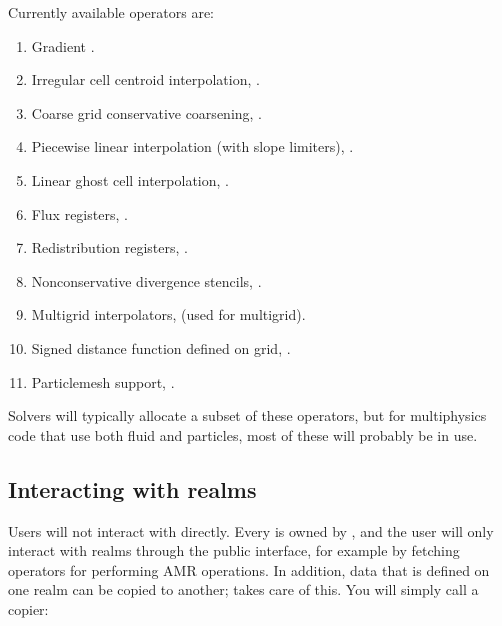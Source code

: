 \documentclass[letterpaper,10pt,english]{sphinxmanual}
\begin{document}
Currently available operators are:
\begin{enumerate}
%
\item {} 
Gradient .

\item {} 
Irregular cell centroid interpolation, .

\item {} 
Coarse grid conservative coarsening, .

\item {} 
Piecewise linear interpolation (with slope limiters), .

\item {} 
Linear ghost cell interpolation, .

\item {} 
Flux registers, .

\item {} 
Redistribution registers, .

\item {} 
Non\sphinxhyphen{}conservative divergence stencils, .

\item {} 
Multigrid interpolators,  (used for multigrid).

\item {} 
Signed distance function defined on grid, .

\item {} 
Particle\sphinxhyphen{}mesh support, .

\end{enumerate}

Solvers will typically allocate a subset of these operators, but for multiphysics code that use both fluid and particles, most of these will probably be in use.


\subsection{Interacting with realms}
\label{\detokenize{Source/Realm:interacting-with-realms}}
Users will not interact with  directly.
Every  is owned by , and the user will only interact with realms through the public  interface, for example by fetching operators for performing AMR operations.
In addition, data that is defined on one realm can be copied to another;  takes care of this.
You will simply call a copier:
\end{document}
